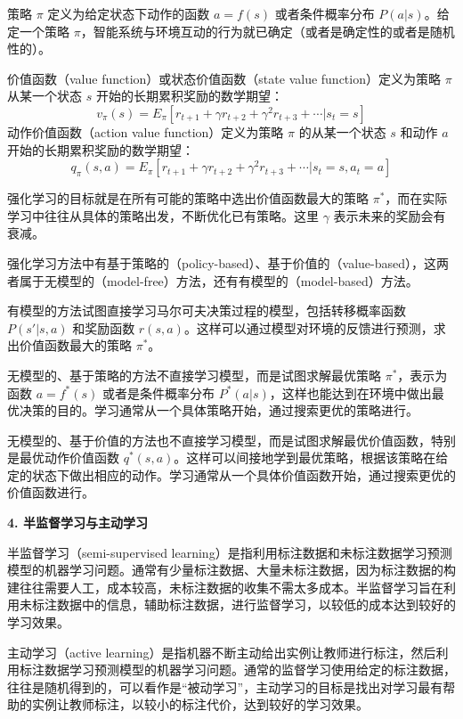 \documentclass[UTF8, 12pt, fontset=fandol, oneside]{ctexart}
\begin{document}
策略 $\pi$ 定义为给定状态下动作的函数 $a=f(s)$ 或者条件概率分布 $P(a|s)$。给定一个策略 $\pi$，智能系统与环境互动的行为就已确定（或者是确定性的或者是随机性的）。

价值函数（value function）或状态价值函数（state value function）定义为策略 $\pi$ 从某一个状态 $s$ 开始的长期累积奖励的数学期望：
\begin{equation}
  v_\pi(s)=E_\pi[r_{t+1}+\gamma r_{t+2}+\gamma^2 r_{t+3}+\cdots|s_t=s]
  \tag{1.1}
\end{equation}
动作价值函数（action value function）定义为策略 $\pi$ 的从某一个状态 $s$ 和动作 $a$ 开始的长期累积奖励的数学期望：
\begin{equation}
  q_\pi(s,a)=E_\pi[r_{t+1}+\gamma r_{t+2}+\gamma^2 r_{t+3}+\cdots|s_t=s,a_t=a]
  \tag{1.2}
\end{equation}

强化学习的目标就是在所有可能的策略中选出价值函数最大的策略 $\pi^*$，而在实际学习中往往从具体的策略出发，不断优化已有策略。这里 $\gamma$ 表示未来的奖励会有衰减。

强化学习方法中有基于策略的（policy-based）、基于价值的（value-based），这两者属于无模型的（model-free）方法，还有有模型的（model-based）方法。

有模型的方法试图直接学习马尔可夫决策过程的模型，包括转移概率函数 $P(s'|s,a)$ 和奖励函数 $r(s,a)$。这样可以通过模型对环境的反馈进行预测，求出价值函数最大的策略 $\pi^*$。

无模型的、基于策略的方法不直接学习模型，而是试图求解最优策略 $\pi^*$，表示为函数 $a=f^*(s)$ 或者是条件概率分布 $P^*(a|s)$，这样也能达到在环境中做出最优决策的目的。学习通常从一个具体策略开始，通过搜索更优的策略进行。

无模型的、基于价值的方法也不直接学习模型，而是试图求解最优价值函数，特别是最优动作价值函数 $q^*(s,a)$。这样可以间接地学到最优策略，根据该策略在给定的状态下做出相应的动作。学习通常从一个具体价值函数开始，通过搜索更优的价值函数进行。

\noindent\textbf{4. 半监督学习与主动学习}

半监督学习（semi-supervised learning）是指利用标注数据和未标注数据学习预测模型的机器学习问题。通常有少量标注数据、大量未标注数据，因为标注数据的构建往往需要人工，成本较高，未标注数据的收集不需太多成本。半监督学习旨在利用未标注数据中的信息，辅助标注数据，进行监督学习，以较低的成本达到较好的学习效果。

主动学习（active learning）是指机器不断主动给出实例让教师进行标注，然后利用标注数据学习预测模型的机器学习问题。通常的监督学习使用给定的标注数据，往往是随机得到的，可以看作是“被动学习”，主动学习的目标是找出对学习最有帮助的实例让教师标注，以较小的标注代价，达到较好的学习效果。
\end{document}
